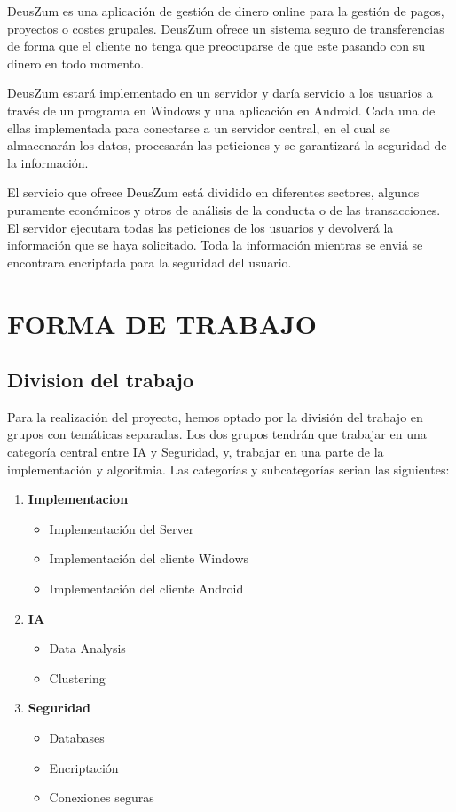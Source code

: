 \documentclass{article}
\theoremstyle{definition}
\begin{document}
DeusZum es una aplicación de gestión de dinero online para la gestión de pagos, proyectos o costes grupales. DeusZum ofrece un sistema seguro de transferencias de forma que el cliente no tenga que preocuparse de que este pasando con su dinero en todo momento.

DeusZum estará implementado en un servidor y daría servicio a los usuarios a través de un programa en Windows y una aplicación en Android. Cada una de ellas implementada para conectarse a un servidor central, en el cual se almacenarán los datos, procesarán las peticiones y se garantizará la seguridad de la información.

El servicio que ofrece DeusZum está dividido en diferentes sectores, algunos puramente económicos y otros de análisis de la conducta o de las transacciones. El servidor ejecutara todas las peticiones de los usuarios y devolverá la información que se haya solicitado. Toda la información mientras se enviá se encontrara encriptada para la seguridad del usuario.

\section{FORMA DE TRABAJO}


\subsection{Division del trabajo}

Para la realización del proyecto, hemos optado por la división del trabajo en grupos con temáticas separadas. Los dos grupos tendrán que trabajar en una categoría central entre IA y Seguridad, y, trabajar en una parte de la implementación y algoritmia. Las categorías y subcategorías serian las siguientes:

\begin{enumerate}
    \item \textbf{Implementacion} \begin{itemize}
        \item Implementación del Server
        \item Implementación del cliente Windows
        \item Implementación del cliente Android
    \end{itemize}
    \item \textbf{IA} \begin{itemize}
        \item Data Analysis
        \item Clustering
    \end{itemize}
    \item \textbf{Seguridad} \begin{itemize}
        \item Databases
        \item Encriptación
        \item Conexiones seguras
    \end{itemize}
\end{enumerate}
\end{document}
